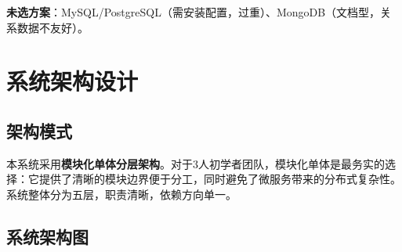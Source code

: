 \documentclass[12pt,a4paper]{report}
\begin{document}
\textbf{未选方案}：MySQL/PostgreSQL（需安装配置，过重）、MongoDB（文档型，关系数据不友好）。


\chapter{系统架构设计}

\section{架构模式}

本系统采用\textbf{模块化单体分层架构}。对于3人初学者团队，模块化单体是最务实的选择：它提供了清晰的模块边界便于分工，同时避免了微服务带来的分布式复杂性。系统整体分为五层，职责清晰，依赖方向单一。

\section{系统架构图}
\end{document}
